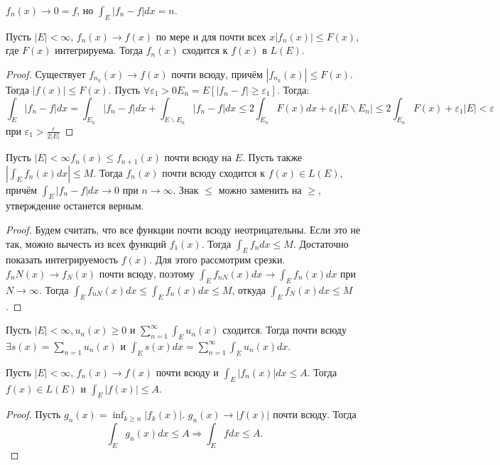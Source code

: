 \documentclass[11pt]{article}
\newcounter{th}\setcounter{th}{0}
\def\th{\par\smallskip\refstepcounter{th}\textbf{\arabic{th}}}
\newtheorem*{Theorem}{Теорема \th}
\newcounter{cnsqnc}\setcounter{cnsqnc}{0}
\def\cnsqnc{\par\smallskip\refstepcounter{cnsqnc}\textbf{\arabic{cnsqnc}}}
\newtheorem*{Consequence}{Следствие \cnsqnc}
\begin{document}
$f_n(x) \to 0 = f$, но $\int_E|f_n - f|dx = n$.
\begin{Theorem}
Пусть $|E| < \infty$, $f_n(x) \to f(x)$ по мере и для почти всех $x |f_n(x)| \leq F(x)$, где
$F(x)$ интегрируема. Тогда $f_n(x)$ сходится к $f(x)$ в $L(E)$.
\end{Theorem}
\begin{proof}
Существует $f_{n_k}(x) \to f(x)$ почти всюду, причём $|f_{n_k}(x)| \leq F(x)$. Тогда
$|f(x)| \leq F(x)$. Пусть $\forall \varepsilon_1 > 0 E_n = E[|f_n - f| \geq \varepsilon_1]$.
Тогда:
\begin{equation}
\int_E|f_n - f|dx = \int_{E_n}|f_n - f|dx + \int_{E\backslash E_n}|f_n - f|dx \leq 2\int_{E_n}F(x)dx +
\varepsilon_1|E\backslash E_n| \leq 2\int_{E_n}F(x) + \varepsilon_1|E| < \varepsilon
\end{equation}
при $\varepsilon_1 > \frac{\varepsilon}{2|E|}$
\end{proof}
\begin{Theorem}
Пусть $|E| < \infty f_n(x) \leq f_{n + 1}(x)$ почти всюду на $E$. Пусть также $|\int_Ef_n(x)dx| \leq M$.
Тогда $f_n(x)$ почти всюду сходится к $f(x) \in L(E)$, причём $\int_E|f_n - f|dx \to 0$ при $n \to \infty$.
Знак $\leq$ можно заменить на $\geq$, утверждение останется верным.
\end{Theorem}
\begin{proof}
Будем считать, что все функции почти всюду неотрицательны. Если это не так, можно вычесть из
всех функций $f_1(x)$. Тогда $\int_Ef_ndx \leq M$. Достаточно показать интегрируемость $f(x)$.
Для этого рассмотрим срезки. $f_nN(x) \to f_N(x)$ почти всюду, поэтому
$\int_Ef_{nN}(x)dx \to \int_Ef_n(x)dx$ при $N \to \infty$. Тогда $\int_Ef_{nN}(x)dx \leq \int_Ef_n(x)dx \leq M$,
откуда $\int_Ef_N(x)dx \leq M$.
\end{proof}
\begin{Consequence}
Пусть $|E| < \infty, u_n(x) \geq 0$ и $\sum_{n = 1}^{\infty}\int_Eu_n(x)$ сходится. Тогда почти
всюду $\exists s(x) = \sum_{n = 1}u_n(x)$ и $\int_Es(x)dx = \sum_{n = 1}^{\infty}\int_Eu_n(x)dx$.
\end{Consequence}
\begin{Theorem}
Пусть $|E| < \infty$, $f_n(x) \to f(x)$ почти всюду и $\int_E|f_n(x)|dx \leq A$. Тогда
$f(x) \in L(E)$ и $\int_E|f(x)| \leq A$.
\end{Theorem}
\begin{proof}
Пусть $g_n(x) = \inf_{k \geq n}|f_k(x)|$. $g_n(x) \to |f(x)|$ почти всюду. Тогда
\begin{equation}
\int_Eg_n(x)dx \leq A \Rightarrow \int_Efdx \leq A.
\end{equation}
\end{proof}
\end{document}

